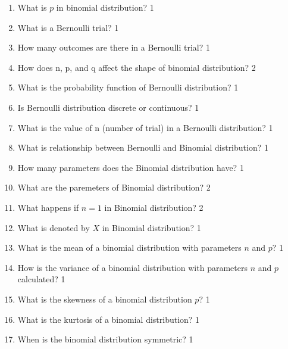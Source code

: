 \documentclass[a4paper,oneside, margin=1.4in]{book}
\begin{document}
 \begin{enumerate}
 
 \item What is $p$ in binomial distribution? \hfill 1
 
 \item What is a Bernoulli trial?  \hfill 1
 
 \item How many outcomes are there in a Bernoulli trial?  \hfill 1
 
 \item How does n, p, and q affect the shape of binomial distribution? \hfill 2
 
 \item What is the probability function of Bernoulli distribution? \hfill 1
 
 \item Is Bernoulli distribution discrete or continuous? \hfill 1
 
 \item What is the value of n (number of trial) in a Bernoulli distribution? \hfill 1
 
 \item What is relationship between Bernoulli and Binomial distribution? \hfill 1
 
 \item How many parameters does the Binomial distribution have? \hfill 1
  
  \item What are the paremeters of Binomial distribution? \hfill 2
  
  \item What happens if $n=1$ in Binomial distribution? \hfill 2
  
  \item What is denoted by $X$ in Binomial distribution? \hfill 1
  
 \item What is the mean of a binomial distribution with parameters \( n \) and \( p \)? \hfill 1

\item How is the variance of a binomial distribution with parameters \( n \) and \( p \) calculated? \hfill 1

\item What is the skewness of a binomial distribution \( p \)? \hfill 1

\item What is the kurtosis of a binomial distribution? \hfill 1

\item When is the binomial distribution symmetric? \hfill 1


\end{enumerate}
\end{document}
